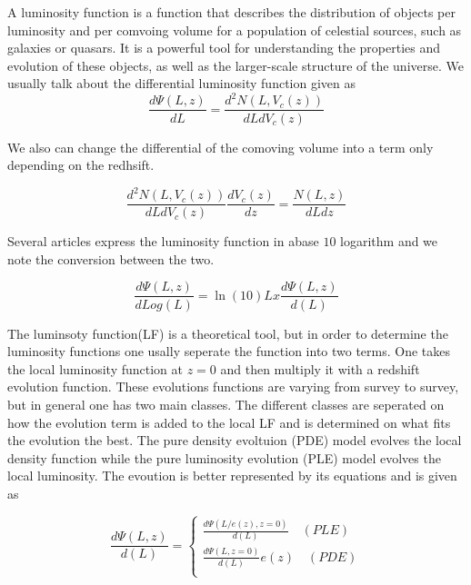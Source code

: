 \documentclass{article}
\begin{document}
A luminosity function is a function that describes the distribution of objects per luminosity and per comvoing volume for a population of celestial sources,
such as galaxies or quasars. It is a powerful tool for understanding the properties and evolution of 
these objects, as well as the larger-scale structure of the universe. 
 We usually talk about the differential luminosity function given as
\begin{equation}
    \frac{d\Psi(L,z)}{dL} = \frac{d^2N(L,V_c(z))}{dLdV_c(z)}
\end{equation}

We also can change the differential of the comoving volume into a term only depending on the redhsift.

\begin{equation}
    \frac{d^2N(L,V_c(z))}{dLdV_c(z)}\frac{dV_c(z)}{dz} = \frac{N(L,z)}{dLdz}
\end{equation}


Several articles express the luminosity function in abase $10$ logarithm and we note the conversion between the two. 

\begin{equation}
    \frac{d\Psi(L,z)}{dLog(L)} =  \ln (10)  Lx \frac{d\Psi(L,z)}{d(L)}
\end{equation}


The luminsoty function(LF) is a theoretical tool, but in order to determine the luminosity functions one usally seperate the function into two terms. 
One takes the local luminosity function at $z=0$ and then multiply it with a redshift evolution function. These evolutions functions
are varying from survey to survey, but in general one has two main classes. 
The different classes are seperated on how the evolution term is added to the local LF and is determined on what fits the evolution the best. 
The pure density evoltuion (PDE) model evolves the local density function while the pure luminosity evolution (PLE) model evolves the local luminosity.
The evoution is better represented by its equations and is given as 

\begin{equation}\frac{d\Psi(L,z)}{d(L)} = 
    \begin{cases}
        \frac{d\Psi(L/e(z),z=0)}{d(L)} \quad (PLE)\\
        \frac{d\Psi(L,z=0)}{d(L)}e(z) \quad (PDE)\\
    \end{cases}
\end{equation}
\end{document}
